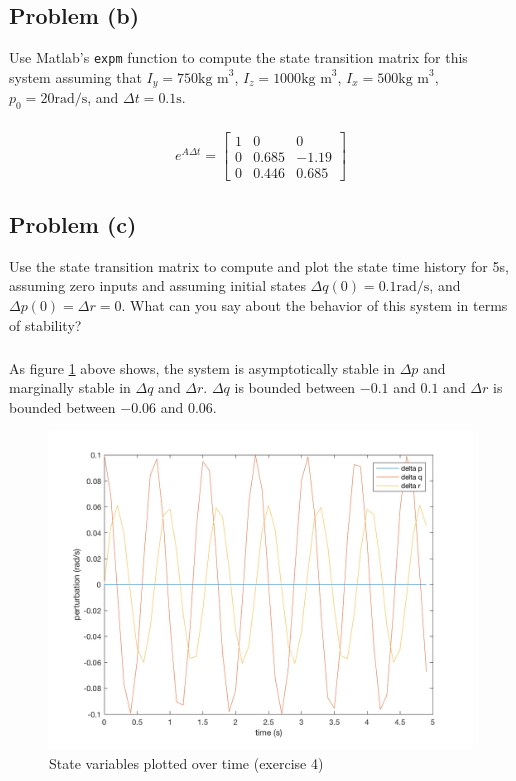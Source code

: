 \documentclass[11pt]{article}
\begin{document}
\subsection*{Problem (b)}
Use Matlab's \texttt{expm} function to compute the state transition matrix for this system assuming that $I_y=750\text{kg m}^3$, $I_z=1000\text{kg m}^3$, $I_x=500 \text{kg m}^3$, $p_0 = 20 \text{rad/s}$, and $\Delta t=0.1\text{s}$.

\subparagraph*{}
\begin{equation*}
	e^{A\Delta t} = \begin{bmatrix}
					1 & 0 & 0 \\
					0 & 0.685 & -1.19 \\
					0 & 0.446 & 0.685
					\end{bmatrix}
\end{equation*}

\subsection*{Problem (c)}
Use the state transition matrix to compute and plot the state time history for 5s, assuming zero inputs and assuming initial states $\Delta q(0) = 0.1\text{rad/s}$, and $\Delta p(0) = \Delta r = 0$. What can you say about the behavior of this system in terms of stability?

\subparagraph*{}
As figure \ref{fig:prob4} above shows, the system is asymptotically stable in $\Delta p$ and marginally stable in $\Delta q$ and $\Delta r$. $\Delta q$ is bounded between $-0.1$ and $0.1$ and $\Delta r$ is bounded between $-0.06$ and $0.06$.

\begin{figure}
	\centerline{\includegraphics[width=0.67\linewidth]{prob_4_fig.png}}
	\caption{State variables plotted over time (exercise 4)}
	\label{fig:prob4}
\end{figure}
\end{document}
